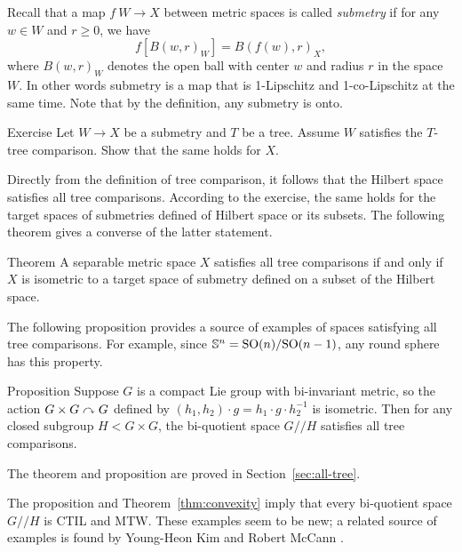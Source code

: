 Recall that a map $f\:W\to X$ between metric spaces is called \emph{submetry} if for any $w\in W$ and $r\ge 0$, we have 
\[f[B(w,r)_W]=B(f(w),r)_X,\]
where $B(w,r)_W$ denotes the open ball with center $w$ and radius $r$ in the space $W$.
In other words submetry is a map that is 1-Lipschitz and 1-co-Lipschitz at the same time.
Note that by the definition, any submetry is onto.

\begin{thm}{Exercise}
Let $W\to X$ be a submetry and $T$ be a tree.
Assume $W$ satisfies the $T$-tree comparison.
Show that the same holds for $X$.
\end{thm}

Directly from the definition of tree comparison, it follows that the Hilbert space satisfies all tree comparisons.
According to the exercise, the same holds for the target spaces of submetries defined of Hilbert space or its subsets.
The following theorem gives a converse of the latter statement.


\begin{thm}{Theorem}\label{thm:hilbert-quotient}
A separable metric space $X$ satisfies all tree comparisons if and only if
$X$ is isometric to a target space of submetry defined on a subset  of the Hilbert space.
\end{thm} %

The following proposition provides a source of examples of spaces satisfying all tree comparisons.
For example, since $\mathbb{S}^n=\mathrm{SO}(n)/\mathrm{SO}(n-1)$, any round sphere has this property.

\begin{thm}{Proposition}\label{prop:group}
Suppose $G$ is a compact Lie group with bi-invariant metric, so the action $G\times G\curvearrowright G$ defined by $(h_1,h_2)\cdot g=h_1\cdot g\cdot  h_2^{-1}$ is isometric. 
Then for any closed subgroup $H<G\times G$, the bi-quotient space $G/\!\!/H$ satisfies all tree comparisons.
\end{thm}

The theorem and proposition are proved in Section~\ref{sec:all-tree}.

The proposition and Theorem~\ref{thm:convexity} imply that every bi-quotient space $G/\!\!/H$ is CTIL and MTW.
These examples seem to be new; a related source of examples is found by Young-Heon Kim and Robert McCann \cite{kim-mccann}.

